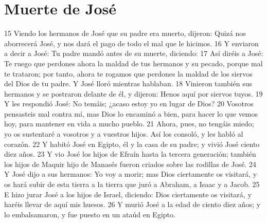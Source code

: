 \section{Muerte de José}

15 Viendo los hermanos de José que su padre era muerto, dijeron: Quizá nos aborrecerá José, y nos dará el pago de todo el mal que le hicimos.
16 Y enviaron a decir a José: Tu padre mandó antes de su muerte, diciendo:
17 Así diréis a José: Te ruego que perdones ahora la maldad de tus hermanos y su pecado, porque mal te trataron; por tanto, ahora te rogamos que perdones la maldad de los siervos del Dios de tu padre. Y José lloró mientras hablaban.
18 Vinieron también sus hermanos y se postraron delante de él, y dijeron: Henos aquí por siervos tuyos.
19 Y les respondió José: No temáis; ¿acaso estoy yo en lugar de Dios?
20 Vosotros pensasteis mal contra mí, mas Dios lo encaminó a bien, para hacer lo que vemos hoy, para mantener en vida a mucho pueblo.
21 Ahora, pues, no tengáis miedo; yo os sustentaré a vosotros y a vuestros hijos. Así los consoló, y les habló al corazón.
22 Y habitó José en Egipto, él y la casa de su padre; y vivió José ciento diez años.
23 Y vio José los hijos de Efraín hasta la tercera generación; también los hijos de Maquir hijo de Manasés fueron criados sobre las rodillas de José.
24 Y José dijo a sus hermanos: Yo voy a morir; mas Dios ciertamente os visitará, y os hará subir de esta tierra a la tierra que juró a Abraham, a Isaac y a Jacob.
25 E hizo jurar José a los hijos de Israel, diciendo: Dios ciertamente os visitará, y haréis llevar de aquí mis huesos.
26 Y murió José a la edad de ciento diez años; y lo embalsamaron, y fue puesto en un ataúd en Egipto.


